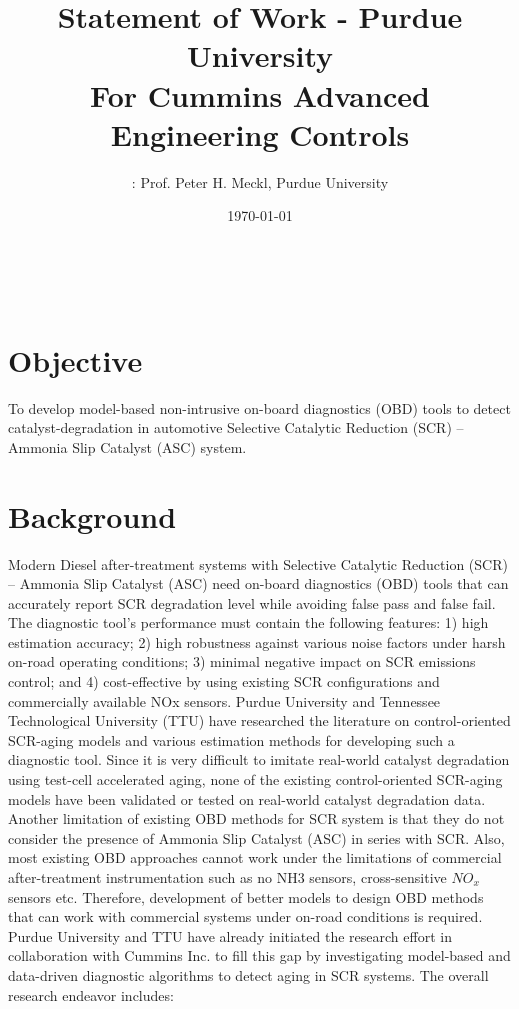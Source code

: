 \documentclass[letterpaper, 11pt]{article}
\title{Statement of Work - Purdue University \\ For Cummins Advanced Engineering Controls}
\author{
\itbf{Principal Investigator}: Prof. Peter H. Meckl, Purdue University}
\date{\today}
\begin{document}
\maketitle
\tableofcontents
\newpage
\
\newpage

\section{Objective}
To develop model-based non-intrusive on-board diagnostics (OBD) tools to detect catalyst-degradation in automotive Selective Catalytic Reduction (SCR) – Ammonia Slip Catalyst (ASC) system.

\section{Background}
Modern Diesel after-treatment systems with Selective Catalytic Reduction (SCR) – Ammonia Slip Catalyst (ASC) need on-board diagnostics (OBD) tools that can accurately report SCR degradation level while avoiding false pass and false fail. The diagnostic tool’s performance must contain the following features: 1) high estimation accuracy; 2) high robustness against various noise factors under harsh on-road operating conditions; 3) minimal negative impact on SCR emissions control; and 4) cost-effective by using existing SCR configurations and commercially available NOx sensors.
Purdue University and Tennessee Technological University (TTU) have researched
the literature on control-oriented SCR-aging models and various estimation
methods for developing such a diagnostic tool. Since it is very difficult to
imitate real-world catalyst degradation using test-cell accelerated aging, none
of the existing control-oriented SCR-aging models have been validated or tested
on real-world catalyst degradation data. Another limitation of existing OBD
methods for SCR system is that they do not consider the presence of Ammonia Slip
Catalyst (ASC) in series with SCR. Also, most existing OBD approaches cannot
work under the limitations of commercial after-treatment instrumentation such as
no NH3 sensors, cross-sensitive $NO_x$ sensors etc. Therefore, development of
better models to design OBD methods that can work with commercial systems under
on-road conditions is required.
Purdue University and TTU have already initiated the research effort in
collaboration with Cummins Inc. to fill this gap by investigating model-based
and data-driven diagnostic algorithms to detect aging in SCR systems. The
overall research endeavor includes:
\end{document}
